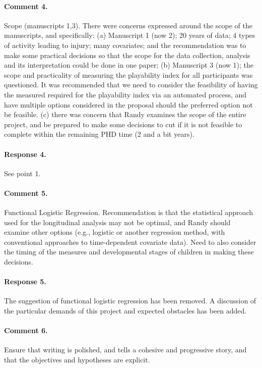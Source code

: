 \documentclass [11pt]{article}
\begin{document}
\paragraph{Comment 4.}Scope (manuscripts 1,3).  There were concerns expressed around the scope of the manuscripts, and specifically: (a) Manuscript 1 (now 2);  20 years of data; 4 types of activity leading to injury; many covariates; and the recommendation was to make some practical decisions so that the scope for the data collection, analysis and its interpretation could be done in one paper;  (b) Manuscript 3 (now 1);  the scope and practicality of measuring the playability index for all participants was questioned.  It was recommended that we need to consider the feasibility of having the measured required for the playability index via an automated process, and have multiple options considered in the proposal should the preferred option not be feasible.  (c) there was concern that Randy examines the scope of the entire project, and be prepared to make some decisions to cut if it is not feasible to complete within the remaining PHD time (2 and a bit years).

\paragraph{Response 4.}See point 1.

\paragraph{Comment 5.}Functional Logistic Regression.  Recommendation is that the statistical approach used for the longitudinal analysis may not be optimal, and Randy should examine other options (e.g., logistic or another regression method, with conventional approaches to time-dependent covariate data).  Need to also consider the timing of the measures and developmental stages of children in making these decisions.

\paragraph{Response 5.}The suggestion of functional logistic regression has been removed. A discussion of the particular demands of this project and expected obstacles has been added.

\paragraph{Comment 6.}Ensure that writing is polished, and tells a cohesive and progressive story, and that the objectives and hypotheses are explicit.
\end{document}
